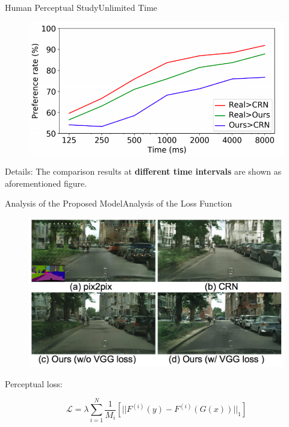 \documentclass{beamer}
\begin{document}
\begin{frame}{Human Perceptual Study}{Unlimited Time}
\begin{figure}
	\centering
	\includegraphics[height=0.45\textheight]{images/limite_time}
\end{figure}
%
%
\begin{beamerboxesrounded}[upper=uppercol,lower=lowercol,shadow=false]{Details: }
The comparison results at \textbf{different time intervals} are shown as aforementioned figure.
\end{beamerboxesrounded}
\end{frame}

\begin{frame}{Analysis of the Proposed Model}{Analysis of the Loss Function}
\begin{figure}
	\centering
	\includegraphics[height=0.6\textheight]{images/result_1}
\end{figure}
%
%
\begin{beamerboxesrounded}[upper=uppercol,lower=lowercol,shadow=false]{Perceptual loss: }
	
\begin{equation}
\mathcal{L}=\lambda\sum_{i=1}^N \frac{1}{M_i}[||F^{(i)}(y)-F^{(i)}(G(x))||_1]
\end{equation} 

\end{beamerboxesrounded}
\end{frame}
\end{document}
